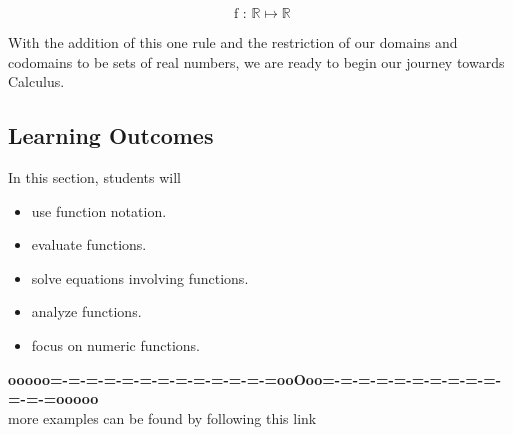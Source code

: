 \documentclass{ximera}
\begin{document}
\[
\text{ f : } \mathbb{R} \mapsto \mathbb{R}
\]





With the addition of this one rule and the restriction of our domains and codomains to be sets of real numbers, we are ready to begin our journey towards Calculus.








\subsection{Learning Outcomes}


\begin{sectionOutcomes}
In this section, students will 

\begin{itemize}
\item use function notation.
\item evaluate functions.
\item solve equations involving functions.
\item analyze functions.
\item focus on numeric functions.
\end{itemize}
\end{sectionOutcomes}







\begin{center}
\textbf{\textcolor{green!50!black}{ooooo=-=-=-=-=-=-=-=-=-=-=-=-=ooOoo=-=-=-=-=-=-=-=-=-=-=-=-=ooooo}} \\

more examples can be found by following this link\\ 

\end{center}
\end{document}
